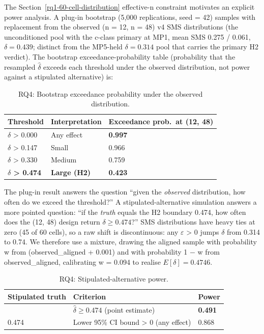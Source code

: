 \documentclass[manuscript,screen,review]{acmart}
\begin{document}
The Section~\ref{rq1-60-cell-distribution} effective-n constraint motivates an explicit power analysis. A
plug-in bootstrap (5,000 replications, seed = 42) samples with
replacement from the observed (n = 12, n = 48) v4 SMS distributions (the
unconditioned pool with the c-class primary at MP1, mean SMS 0.275 / 0.061,
$\delta = 0.439$; distinct from the MP5-held $\delta = 0.314$ pool that
carries the primary H2 verdict). The
bootstrap exceedance-probability table (probability that the resampled
$\hat\delta$ exceeds each threshold under the observed distribution, not
power against a stipulated alternative) is:

{%
\begin{longtable}[]{@{}lll@{}}
\caption{RQ4: Bootstrap exceedance probability under the observed
distribution.}\\
\toprule\noalign{}
Threshold & Interpretation & Exceedance prob.\ at (12, 48) \\
\midrule\noalign{}
\endhead
\bottomrule\noalign{}
\endlastfoot
$\delta$ \textgreater{} 0.000 & Any effect & \textbf{0.997} \\
$\delta$ \textgreater{} 0.147 & Small & 0.966 \\
$\delta$ \textgreater{} 0.330 & Medium & 0.759 \\
\textbf{$\delta$ \textgreater{} 0.474} & \textbf{Large (H2)} &
\textbf{0.423} \\
\end{longtable}
}

The plug-in result answers the question ``given the \emph{observed}
distribution, how often do we exceed the threshold?'' A
stipulated-alternative simulation answers a more pointed question: ``if
the \emph{truth} equals the H2 boundary 0.474, how often does the (12,
48) design return $\delta \geq 0.474$?'' SMS distributions have heavy ties at zero
(45 of 60 cells), so a raw shift is discontinuous: any $\varepsilon$ \textgreater{}
0 jumps $\delta$ from 0.314 to 0.74. We therefore use a mixture, drawing the
aligned sample with probability w from (observed\_aligned + 0.001) and
with probability 1 $-$ w from observed\_aligned, calibrating w = 0.094 to
realise $E[\delta] = 0.4746$.

{%
\begin{longtable}[]{@{}lll@{}}
\caption{RQ4: Stipulated-alternative power.}\label{tab:p2-11}\\
\toprule\noalign{}
Stipulated truth & Criterion & Power \\
\midrule\noalign{}
\endfirsthead
\endhead
\bottomrule\noalign{}
\endlastfoot
0.474 & $\hat{\delta} \geq 0.474$ (point estimate) & \textbf{0.491} \\
0.474 & Lower 95\% CI bound \textgreater{} 0 (any effect) & 0.868 \\
\end{longtable}
}
\end{document}

